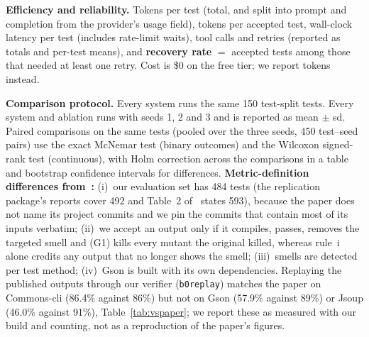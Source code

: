 \textbf{Efficiency and reliability.} Tokens per test (total, and split into prompt and completion from the provider's usage field), tokens per accepted test, wall-clock latency per test (includes rate-limit waits), tool calls and retries (reported as totals and per-test means), and
\textbf{recovery rate} $=$ accepted tests among those that needed at least one retry. Cost is \$0 on the free tier; we report tokens instead.

\textbf{Comparison protocol.} Every system runs the same 150 test-split tests. Every system and ablation runs with seeds 1, 2 and 3 and is reported as mean $\pm$ sd. Paired comparisons on the same tests (pooled over the three seeds, 450 test--seed pairs) use the exact McNemar test (binary outcomes) and the Wilcoxon
signed-rank test (continuous), with Holm correction across the comparisons in a table and bootstrap confidence intervals for differences.
\textbf{Metric-definition differences from~\cite{utrefactor}:} (i)~our evaluation set has 484 tests (the replication package's reports cover 492 and Table~2 of~\cite{utrefactor} states 593), because the paper does not name its project commits and we pin the commits that contain most of its inputs verbatim; (ii)~we accept an output only if it compiles, passes, removes the targeted smell and (G1) kills every mutant the original killed, whereas rule~i alone credits any output that no longer shows the smell; (iii)~smells are detected per test method; (iv)~Gson is built with its own dependencies. Replaying the published outputs through our verifier (\texttt{b0replay}) matches the paper on Commons-cli (86.4\% against 86\%) but not on Gson (57.9\% against 89\%) or Jsoup (46.0\% against 91\%), Table~\ref{tab:vspaper}; we report these as measured with our build and counting, not as a reproduction of the paper's figures.
